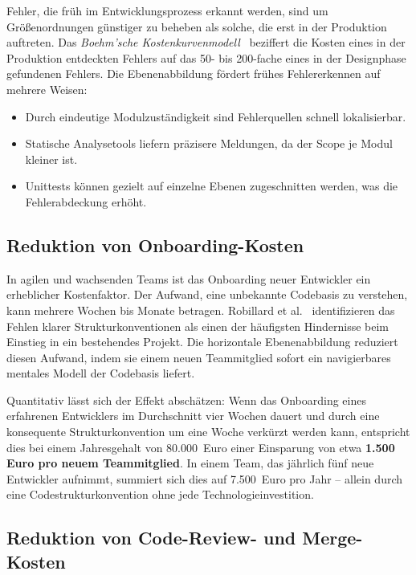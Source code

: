 ﻿\documentclass[a4paper,12pt]{article}
\begin{document}
Fehler, die früh im Entwicklungsprozess erkannt werden, sind um Größenordnungen
günstiger zu beheben als solche, die erst in der Produktion auftreten. Das
\textit{Boehm'sche Kostenkurvenmodell}~\cite{boehm1981} beziffert die Kosten
eines in der Produktion entdeckten Fehlers auf das 50- bis 200-fache eines
in der Designphase gefundenen Fehlers. Die Ebenenabbildung fördert frühes
Fehlererkennen auf mehrere Weisen:

\begin{itemize}[leftmargin=*]
	\item Durch eindeutige Modulzuständigkeit sind Fehlerquellen schnell lokalisierbar.
	\item Statische Analysetools liefern präzisere Meldungen, da der Scope je Modul
	kleiner ist.
	\item Unittests können gezielt auf einzelne Ebenen zugeschnitten werden, was die
	Fehlerabdeckung erhöht.
\end{itemize}

\subsection{Reduktion von Onboarding-Kosten}

In agilen und wachsenden Teams ist das Onboarding neuer Entwickler ein
erheblicher Kostenfaktor. Der Aufwand, eine unbekannte Codebasis zu verstehen,
kann mehrere Wochen bis Monate betragen. Robillard et al.~\cite{robillard2011}
identifizieren das Fehlen klarer Strukturkonventionen als einen der häufigsten
Hindernisse beim Einstieg in ein bestehendes Projekt. Die horizontale
Ebenenabbildung reduziert diesen Aufwand, indem sie einem neuen Teammitglied
sofort ein navigierbares mentales Modell der Codebasis liefert.

Quantitativ lässt sich der Effekt abschätzen: Wenn das Onboarding eines
erfahrenen Entwicklers im Durchschnitt vier Wochen dauert und durch eine
konsequente Strukturkonvention um eine Woche verkürzt werden kann, entspricht
dies bei einem Jahresgehalt von 80.000~Euro einer Einsparung von etwa
\textbf{1.500 Euro pro neuem Teammitglied}. In einem Team, das jährlich fünf
neue Entwickler aufnimmt, summiert sich dies auf 7.500~Euro pro Jahr -- allein
durch eine Codestrukturkonvention ohne jede Technologieinvestition.

\subsection{Reduktion von Code-Review- und Merge-Kosten}
\end{document}
